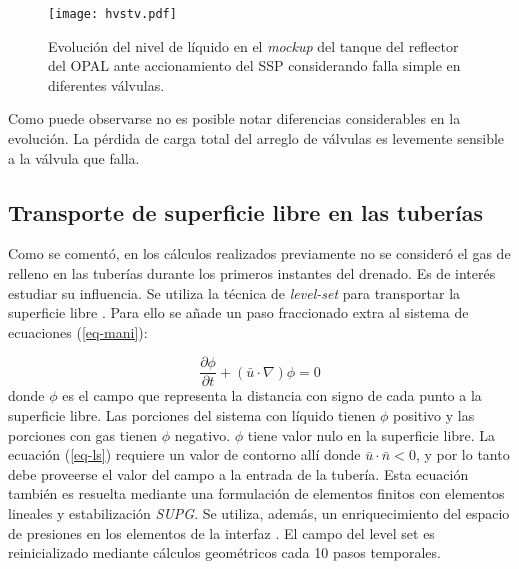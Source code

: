 \begin{figure}[ht]
\centering
\texttt{[image: hvstv.pdf]}
\caption[Evolución del nivel de líquido en el \textit{mockup} del tanque del reflector del OPAL ante accionamiento del SSP considerando falla simple en diferentes válvulas]
{Evolución del nivel de líquido en el \textit{mockup} del tanque del reflector del OPAL ante accionamiento del SSP considerando falla simple en diferentes válvulas.}
\label{hvstv} 
\end{figure}

Como puede observarse no es posible notar diferencias considerables en la evolución.
La pérdida de carga total del arreglo de válvulas es levemente sensible a la válvula que falla.

\subsection*{Transporte de superficie libre en las tuberías}
\label{3:level-set}

Como se comentó, en los cálculos realizados previamente no se consideró el gas de relleno en las tuberías durante los primeros instantes del drenado.
Es de interés estudiar su influencia.
Se utiliza la técnica de \textit{level-set} para transportar la superficie libre \cite{level-set}.
Para ello se añade un paso fraccionado extra al sistema de ecuaciones (\ref{eq-mani}):

\begin{equation}
\frac{\partial\phi}{\partial t}+ (\bar{u} \cdot \nabla) \phi = 0
\label{eq-ls}
\end{equation}
donde $\phi$ es el campo que representa la distancia con signo de cada punto a la superficie libre.
Las porciones del sistema con líquido tienen $\phi$ positivo y las porciones con gas tienen $\phi$ negativo.
$\phi$ tiene valor nulo en la superficie libre.
La ecuación (\ref{eq-ls}) requiere un valor de contorno allí donde $\bar{u} \cdot \bar{n} < 0$,
y por lo tanto debe proveerse el valor del campo a la entrada de la tubería.
Esta ecuación también es resuelta mediante una formulación de elementos finitos con elementos lineales y estabilización \textit{SUPG}.
Se utiliza, además, un enriquecimiento del espacio de presiones en los elementos de la interfaz \cite{enriq}.
El campo del level set es reinicializado mediante cálculos geométricos cada 10 pasos temporales.

